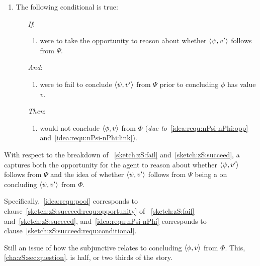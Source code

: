 \begin{note}[\requ{3}]
\begin{idea}[A \requ{0}]
\begin{itemize}
      \begin{enumerate}[label=\arabic*., ref=\named{R:\arabic*}, resume]
      \item
        \label{idea:requ:nPsi-nPhi}
        The following conditional is true:
        \begin{enumerate}
        \item[\emph{If}:]
          \begin{enumerate}[label=\alph*., ref=\named{R:2\alph*}]
          \item
            \label{idea:requ:nPsi-nPhi:opp}
            \vAgent{} were to take the opportunity to reason about whether \(\langle \psi, v' \rangle\) follows from \(\Psi\).
          \end{enumerate}
        \item[\emph{And}:]
          \begin{enumerate}[label=\alph*., ref=\named{R:2\alph*}, resume]
          \item
            \label{idea:requ:nPsi-nPhi:link}
            \vAgent{} were to fail to conclude \(\langle \psi, v' \rangle\) from \(\Psi\) prior to concluding \(\phi\) has value \(v\).
          \end{enumerate}
        \item[\emph{Then}:]
          \begin{enumerate}[label=\alph*., ref=\named{R:2\alph*}, resume]
            \label{idea:requ:nPsi-nPhi:fail}
          \item
            \vAgent{} would not conclude \(\langle \phi, v \rangle\) from \(\Phi\) (\emph{due to}~\ref{idea:requ:nPsi-nPhi:opp} and~\ref{idea:requ:nPsi-nPhi:link}).
          \end{enumerate}
        \end{enumerate}
      \end{enumerate}
    \end{itemize}
    \vspace{-\baselineskip}
  \end{idea}

  With respect to the breakdown of ~\ref{sketch:zS:fail} and~\ref{sketch:zS:succeed}, a \requ{} captures both the opportunity for the agent to reason about whether \(\langle \psi, v' \rangle\) follows from \(\Psi\) and the idea of whether \(\langle \psi, v' \rangle\) follows from \(\Psi\) being a  on concluding \(\langle \psi, v' \rangle\) from \(\Phi\).

  Specifically,~\ref{idea:requ:pool} corresponds to clause~\ref{sketch:zS:succeed:requ:opportunity} of ~\ref{sketch:zS:fail} and~\ref{sketch:zS:succeed}, and~\ref{idea:requ:nPsi-nPhi} corresponds to clause~\ref{sketch:zS:succeed:requ:conditional}.

  Still an issue of how the subjunctive relates to concluding \(\langle \phi, v \rangle\) from \(\Phi\).
  This, \autoref{cha:zS:sec:question}.
  \requ{} is half, or two thirds of the story.
\end{note}

